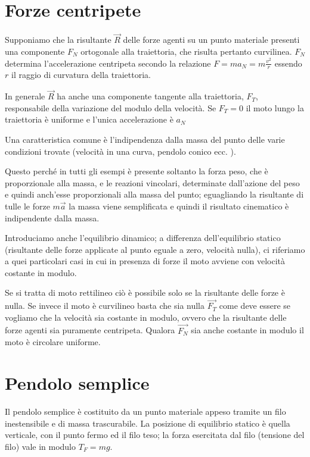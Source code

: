 \documentclass[class=book, crop=false, oneside, 12pt]{standalone}
\begin{document}
\section{Forze centripete}

Supponiamo che la risultante \(\overrightarrow{R}\) delle forze agenti su un punto materiale presenti una componente \(F_N\) ortogonale alla traiettoria, che risulta pertanto curvilinea. \(F_N\) determina l'accelerazione centripeta secondo la relazione \(F = m a_N = m \frac {v^2} {r} \) essendo \(r\) il raggio di curvatura della traiettoria.

In generale \(\overrightarrow{R}\) ha anche una componente tangente alla traiettoria, \(F_T\), responsabile della variazione del modulo della velocità. Se \(F_T = 0\) il moto lungo la traiettoria è uniforme e l'unica accelerazione è \(a_N\)

Una caratteristica comune è l'indipendenza dalla massa del punto delle varie condizioni trovate (velocità in una curva, pendolo conico ecc. ).

Questo perché in tutti gli esempi è presente soltanto la forza peso, che è proporzionale alla massa, e le reazioni vincolari, determinate dall'azione del peso e quindi anch'esse proporzionali alla massa del punto; eguagliando la risultante di tulle le forze \(m \overrightarrow{a}\) la massa viene semplificata e quindi il risultato cinematico è indipendente dalla massa.

Introduciamo anche l'equilibrio dinamico; a differenza dell'equilibrio statico (risultante delle forze applicate al punto eguale a zero, velocità nulla), ci riferiamo a quei particolari casi in cui in presenza di forze il moto avviene con velocità costante in modulo.

Se si tratta di moto rettilineo ciò è possibile solo se la risultante delle forze è nulla.
Se invece il moto è curvilineo basta che sia nulla \(\overrightarrow{F_T}\) come deve essere se vogliamo che la velocità sia costante in modulo, ovvero che la risultante delle forze agenti sia puramente centripeta.
Qualora \(\overrightarrow{F_N}\) sia anche costante in modulo il moto è circolare uniforme.

\section{Pendolo semplice}

Il pendolo semplice è costituito da un punto materiale appeso tramite un filo inestensibile e di massa trascurabile.
La posizione di equilibrio statico è quella verticale, con il punto fermo ed il filo teso; la forza esercitata dal filo (tensione del filo) vale in modulo \(T_F = mg\).
\end{document}

